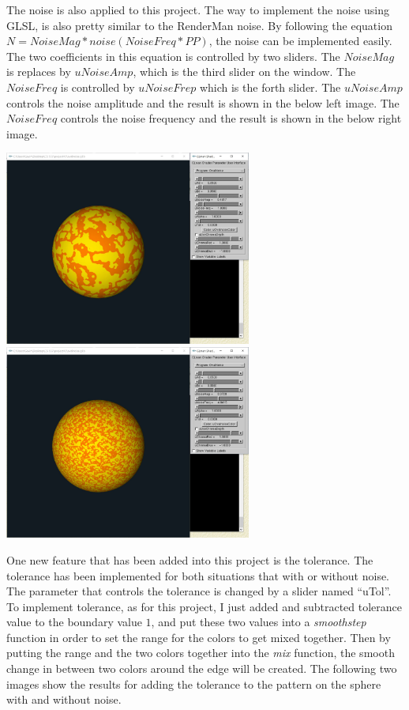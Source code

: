 \documentclass[letterpaper,14pt,titlepage,fleqn]{article}
\begin{document}
The noise is also applied to this project. The way to implement the noise using GLSL, is also pretty similar to the RenderMan noise. By following the equation $N = NoiseMag * noise( NoiseFreq * PP )$, the noise can be implemented easily. The two coefficients in this equation is controlled by two sliders. The $NoiseMag$ is replaces by $uNoiseAmp$, which is the third slider on the window. The $NoiseFreq$ is controlled by $uNoiseFrep$ which is the forth slider. The $uNoiseAmp$ controls the noise amplitude and the result is shown in the below left image. The $NoiseFreq$ controls the noise frequency and the result is shown in the below right image.
\begin{center}
	\includegraphics[width=3.2in]{NA.jpg}
	\includegraphics*[width=3.2in]{NF.jpg}
\end{center}
One new feature that has been added into this project is the tolerance. The tolerance has been implemented for both situations that with or without noise. The parameter that controls the tolerance is changed by a slider named ``uTol''. To implement tolerance, as for this project, I just added and subtracted tolerance value to the boundary value $1$, and put these two values into a \textit{smoothstep} function in order to set the range for the colors to get mixed together. Then by putting the range and the two colors together into the \textit{mix} function, the smooth change in between two colors around the edge will be created. The following two images show the results for adding the tolerance to the pattern on the sphere with and without noise.
\end{document}
